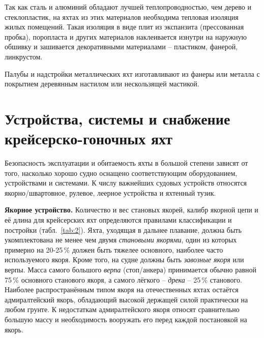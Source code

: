 Так как сталь и алюминий обладают лучшей теплопроводностью, чем дерево и стеклопластик, на яхтах из этих материалов необходима тепловая изоляция жилых помещений. Такая изоляция в виде плит из экспанзита (прессованная пробка), поропласта и других материалов наклеивается изнутри на наружную обшивку и зашивается декоративными материалами \--- пластиком, фанерой, линкрустом.

Палубы и надстройки металлических яхт изготавливают из фанеры или металла с покрытием деревянным настилом или нескользящей мастикой. 

\section{Устройства, системы и снабжение крейсерско-гоночных яхт}

Безопасность эксплуатации и обитаемость яхты в большой степени зависят от того, насколько хорошо судно оснащено соответствующим оборудованием, устройствами и системами. К числу важнейших судовых устройств относятся якорно\-/швартовное, рулевое, леерное устройства и яхтенный тузик.

\textbf{Якорное устройство.}
 Количество и вес становых якорей, калибр якорной цепи и
её длина для крейсерских яхт определяются правилами классификации и
постройки (табл.~\ref{tab:2}). Яхта, уходящая в дальнее плавание,
должна быть укомплектована не менее чем двумя \textit{становыми
якорями}, один из которых примерно на 20-25\,\%
должен быть тяжелее основного, наиболее часто используемого
якоря. Кроме того, на судне должны быть \textit{завозные
якоря} или верпы. Масса самого большого
\textit{верпа} (стоп\-/анкера) принимается обычно равной 75\,\%
основного станового якоря, а самого лёгкого \--- \textit{дрека}
\--- 25\,\% станового.  Наиболее распространённым типом якоря на
отечественных яхтах остаётся адмиралтейский якорь, обладающий высокой
держащей силой практически на любом грунте. К недостаткам
адмиралтейского якоря относят сравнительно большую массу и
необходимость вооружать его перед каждой постановкой на якорь.

